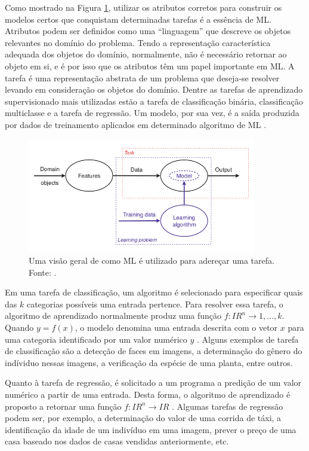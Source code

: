 Como mostrado na Figura \ref{fig:tasks}, utilizar os atributos corretos para construir os modelos certos que conquistam determinadas tarefas é a essência de ML. Atributos podem ser definidos como uma ``linguagem'' que descreve os objetos relevantes no domínio do problema. Tendo a representação característica adequada dos objetos do domínio, normalmente, não é necessário retornar ao objeto em si, e é por isso que os atributos têm um papel importante em ML. A tarefa é uma representação abstrata de um problema que deseja-se resolver levando em consideração os objetos do domínio. Dentre as tarefas de aprendizado supervisionado mais utilizadas estão a tarefa de classificação binária, classificação multiclasse e a tarefa de regressão. Um modelo, por sua vez, é a saída produzida por dados de treinamento aplicados em determinado algoritmo de ML \cite{flach}.

\begin{figure}
\centering
\includegraphics[height=5cm]{imgs/tasks}
\caption{Uma visão geral de como ML é utilizado para adereçar uma tarefa. Fonte: \cite{flach}.}
\label{fig:tasks}
\end{figure}


Em uma tarefa de classificação, um algoritmo é selecionado para especificar quais das $k$ categorias possíveis uma entrada pertence. Para resolver essa tarefa, o algoritmo de aprendizado normalmente produz uma função $f : I\!R^n \rightarrow {1,...,k}$. Quando $y = f(x)$, o modelo denomina uma entrada descrita com o vetor $x$ para uma categoria identificado por um valor numérico $y$ \cite{goodfellow}. Alguns exemplos de tarefa de classificação são a detecção de faces em imagens, a determinação do gênero do indíviduo nessas imagens, a verificação da espécie de uma planta, entre outros.

Quanto à tarefa de regressão, é solicitado a um programa a predição de um valor numérico a partir de uma entrada. Desta forma, o algoritmo de aprendizado é proposto a retornar uma função $f : I\!R^n \rightarrow I\!R$ \cite{goodfellow}. Algumas tarefas de regressão podem ser, por exemplo, a determinação do valor de uma corrida de táxi, a identificação da idade de um indivíduo em uma imagem, prever o preço de uma casa baseado nos dados de casas vendidas anteriormente, etc.

